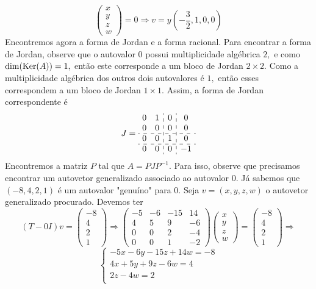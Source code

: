 \documentclass[11pt,a4paper]{article}
\begin{document}
{\[\begin{pmatrix}
x \\
y \\
z \\
w
\end{pmatrix} = 0 \Rightarrow v = y\left(-\frac{3}{2},1,0,0 \right)
\]
Encontremos agora a forma de Jordan e a forma racional.
Para encontrar a forma de Jordan, observe que o autovalor $0$ possui multiplicidade algébrica $2,$ e como $\dim (\operatorname{Ker}(A)) = 1,$ então este corresponde a um bloco de Jordan $2 \times 2.$ Como a multiplicidade algébrica dos outros dois autovalores é $1,$ então esses correspondem a um bloco de Jordan $1 \times 1.$ Assim, a forma de Jordan correspondente é
\[
J = \begin{array}{cc:c:c}
0 & 1 & 0 & 0 \\
0 & 0 & 0 & 0 \\ \hdashline 
0 & 0 & 1 & 0 \\ \hdashline
0 & 0 & 0 & -1
\end{array}
\]
Encontremos a matriz $P$ tal que $A = PJP^{-1}.$
Para isso, observe que precisamos encontrar um autovetor generalizado associado ao autovalor $0.$ Já sabemos que $(-8,4,2,1)$ é um autovalor "genuíno" para $0$. Seja $v = (x,y,z,w)$ o autovetor generalizado procurado. Devemos ter
\[
(T - 0I)v = \begin{pmatrix}
-8 \\
4 \\
2 \\
1
\end{pmatrix} \Rightarrow \begin{pmatrix}
-5 & -6 & -15 & 14 \\
4 & 5 & 9 & -6 \\
0 & 0 & 2 & -4 \\
0 & 0 & 1 & -2
\end{pmatrix} \begin{pmatrix}
x \\
y \\
z \\
w
\end{pmatrix} = \begin{pmatrix}
-8 \\
4 \\
2 \\
1
\end{pmatrix} \Rightarrow \]\[ \begin{cases}
-5x -6y -15z +14w = -8 \\
4x + 5y + 9z -6w = 4 \\
2z -4w = 2 \\

\end{cases}\]}
\end{document}
